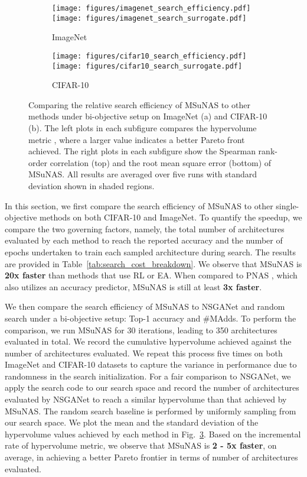 \documentclass[runningheads]{llncs}
\def\ourmethod{MSuNAS}
\begin{document}
\begin{figure}[!thb]
    \begin{subfigure}[b]{0.5\textwidth}
    \centering
    \texttt{[image: figures/imagenet\_search\_efficiency.pdf]}
    \texttt{[image: figures/imagenet\_search\_surrogate.pdf]}
    \caption{ImageNet
    \label{fig:imagenet_search}}
    \end{subfigure}\hfill
    \begin{subfigure}[b]{0.5\textwidth}
    \centering
    \texttt{[image: figures/cifar10\_search\_efficiency.pdf]}
    \texttt{[image: figures/cifar10\_search\_surrogate.pdf]}
    \caption{CIFAR-10
    \label{fig:cifar10_search}}
    \end{subfigure}
\caption{
Comparing the relative search efficiency of \ourmethod{} to other methods under bi-objective setup on ImageNet (a) and CIFAR-10 (b). The left plots in each subfigure compares the hypervolume metric \cite{hypervolume}, where a larger value indicates a better Pareto front achieved. The right plots in each subfigure show the Spearman rank-order correlation (top) and the root mean square error (bottom) of \ourmethod{}. All results are averaged over five runs with standard deviation shown in shaded regions. \label{fig:nsganetv2_search_efficiency}}
\end{figure}

In this section, we first compare the search efficiency of \ourmethod{} to other single-objective methods on both CIFAR-10 and ImageNet. To quantify the speedup, we compare the two governing factors, namely, the total number of architectures evaluated by each method to reach the reported accuracy and the number of epochs undertaken to train each sampled architecture during search. The results are provided in Table~\ref{tab:search_cost_breakdown}. We observe that \ourmethod{} is \textbf{20x faster} than methods that use RL or EA. When compared to PNAS \cite{PNAS}, which also utilizes an accuracy predictor, \ourmethod{} is still at least \textbf{3x faster}.

We then compare the search efficiency of \ourmethod{} to NSGANet \cite{NSGANet} and random search under a bi-objective setup: Top-1 accuracy and \#MAdds. To perform the comparison, we run \ourmethod{} for 30 iterations, leading to 350 architectures evaluated in total. We record the cumulative hypervolume \cite{hypervolume} achieved against the number of architectures evaluated. We repeat this process five times on both ImageNet and CIFAR-10 datasets to capture the variance in performance due to randomness in the search initialization. For a fair comparison to NSGANet, we apply the search code to our search space and record the number of architectures evaluated by NSGANet to reach a similar hypervolume than that achieved by \ourmethod{}. The random search baseline is performed by uniformly sampling from our search space. We plot the mean and the standard deviation of the hypervolume values achieved by each method in Fig.~\ref{fig:nsganetv2_search_efficiency}. Based on the incremental rate of hypervolume metric, we observe that \ourmethod{} is \textbf{2 - 5x faster}, on average, in achieving a better Pareto frontier in terms of number of architectures evaluated.
\end{document}
